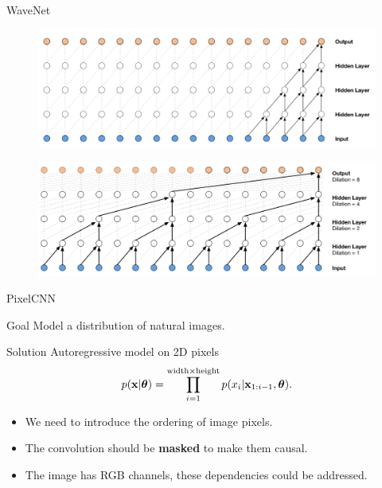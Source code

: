\begin{frame}{WaveNet}
	\begin{figure}
	    \centering
	    \includegraphics[width=0.9\linewidth]{figs/wavenet1.png}
	\end{figure}
	
	\begin{figure}
	    \centering
	    \includegraphics[width=0.9\linewidth]{figs/wavenet2.png}
	\end{figure}
\end{frame}
\begin{frame}{PixelCNN}
	\begin{block}{Goal}
		Model a distribution of natural images.
	\end{block}
	\begin{block}{Solution}
		Autoregressive model on 2D pixels
		\[
		    p(\mathbf{x} | \boldsymbol{\theta}) = \prod_{i=1}^{\text{width} \times \text{height}} p(x_i|\mathbf{x}_{1:i-1}, \boldsymbol{\theta}).
		\]
		\begin{itemize}
			\item We need to introduce the ordering of image pixels.
		    \item The convolution should be \textbf{masked} to make them causal.
		    \item The image has RGB channels, these dependencies could be addressed.
		\end{itemize}
	\end{block}
\end{frame}
